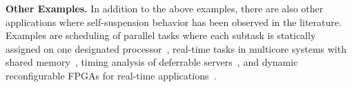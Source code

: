

{\bf Other Examples.} In addition to the above examples, there are also other applications where self-suspension behavior has been observed in the literature. Examples are scheduling of parallel tasks where each subtask is statically assigned on one designated  processor~\cite{fonseca2016response}, real-time tasks in multicore systems with shared memory~\cite{DBLP:conf/dac/HuangCR16}, timing analysis of deferrable servers~\cite{ChenHLRTSS2015}, and dynamic reconfigurable FPGAs for real-time applications~\cite{DBLP:conf/rtss/BiondiBPRMB16}. 



